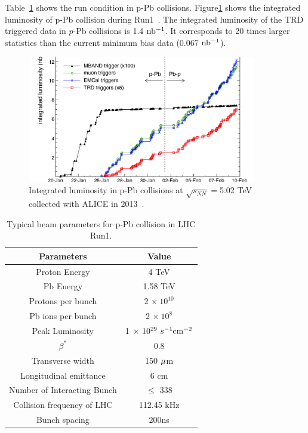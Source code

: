 Table~\ref{table_3_runcondition} shows the run condition in p-Pb collisions. 
Figure\ref{fig_3_luminosity} shows the integrated luminosity of p-Pb collision during Run1~\cite{bib_aprrun1}. 
The integrated luminosity of the TRD triggered data in $p$-Pb collisions is 1.4 $\rm{nb^{-1}}$.
It corresponds to 20 times larger statistics than the current minimum bias data (0.067 $\rm{nb^{-1}}$).

\begin{figure}[!h]
  \centering
  \includegraphics[width=10cm]{chap3/figure/DataSet/IntegratedLuminosity_pPb.png}
  \caption{Integrated luminosity in p-Pb collisions at $\sqrt{s_{NN}}=$5.02 TeV collected with ALICE in 2013~\cite{bib_aprrun1}.}
  \label{fig_3_luminosity}
\end{figure}


\begin{table}
  \centering
  \begin{tabular}{c|c} \hline
    Parameters             & Value                                \\ \hline
    Proton Energy          & 4 TeV                                \\
    Pb Energy              & 1.58 TeV                             \\
    Protons per bunch      & 2 $\times ~ 10^{10}$                     \\ 
    Pb ions per bunch      & 2 $\times ~10^{8}$                      \\
    Peak Luminosity        & 1 $\times ~10^{29} ~s^{-1}\rm{cm}^{-2}$       \\
    $\beta^{*}$            & 0.8                                  \\
    Transverse width       & 150 $\rm{\mu}$m                      \\
    Longitudinal emittance  & 6 cm                                 \\
    Number of Interacting Bunch & $\leq$ 338                         \\
    Collision frequency of LHC & 112.45 kHz                       \\
    Bunch spacing & 200ns                                         \\ \hline
  \end{tabular}
  \caption{Typical beam parameters for p-Pb collision in LHC Run1.}
  \label{table_3_runcondition}
\end{table}



